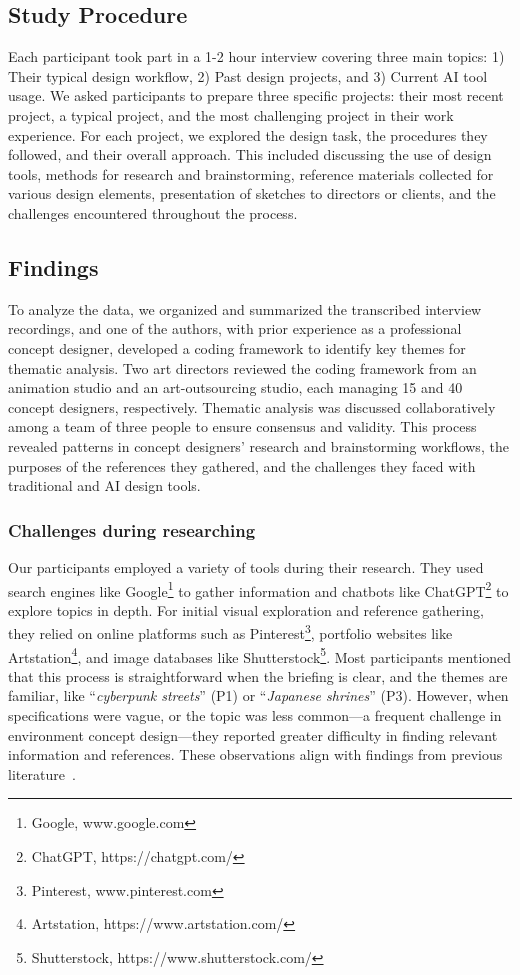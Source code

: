 \subsection{Study Procedure}
Each participant took part in a 1-2 hour interview covering three main topics: 1) Their typical design workflow, 2) Past design projects, and 3) Current AI tool usage. We asked participants to prepare three specific projects: their most recent project, a typical project, and the most challenging project in their work experience. For each project, we explored the design task, the procedures they followed, and their overall approach. This included discussing the use of design tools, methods for research and brainstorming, reference materials collected for various design elements, presentation of sketches to directors or clients, and the challenges encountered throughout the process.

\subsection{Findings}
To analyze the data, we organized and summarized the transcribed interview recordings, and one of the authors, with prior experience as a professional concept designer, developed a coding framework to identify key themes for thematic analysis. Two art directors reviewed the coding framework from an animation studio and an art-outsourcing studio, each managing 15 and 40 concept designers, respectively.
Thematic analysis was discussed collaboratively among a team of three people to ensure consensus and validity. This process revealed patterns in concept designers’ research and brainstorming workflows, the purposes of the references they gathered, and the challenges they faced with traditional and AI design tools. 



\subsubsection{Challenges during researching}

Our participants employed a variety of tools during their research. They used search engines like Google\footnote{Google, www.google.com} to gather information and chatbots like ChatGPT\footnote{ChatGPT, https://chatgpt.com/} to explore topics in depth. For initial visual exploration and reference gathering, they relied on online platforms such as Pinterest\footnote{Pinterest, www.pinterest.com}, portfolio websites like Artstation\footnote{Artstation, https://www.artstation.com/}, and image databases like Shutterstock\footnote{Shutterstock, https://www.shutterstock.com/}. Most participants mentioned that this process is straightforward when the briefing is clear, and the themes are familiar, like “\textit{cyberpunk streets}” (P1) or “\textit{Japanese shrines}” (P3). However, when specifications were vague, or the topic was less common—a frequent challenge in environment concept design—they reported greater difficulty in finding relevant information and references. These observations align with findings from previous literature~\cite{80lv2020, bigbadWorld2015, interview2020, iterationandreference2023}. 

